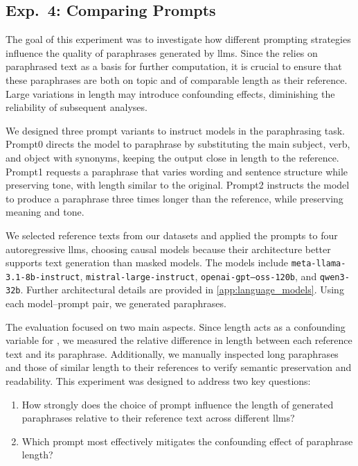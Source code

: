 \subsection{Exp.\ 4: Comparing Prompts}%
\label{subsec:prompt_impact}

The goal of this experiment was to investigate how different prompting strategies influence the quality of paraphrases generated by \acp{llm}.  
Since the \impAppr{} relies on paraphrased text as a basis for further computation, it is crucial to ensure that these paraphrases are both on topic and of comparable length as their reference.  
Large variations in length may introduce confounding effects, diminishing the reliability of subsequent analyses.

We designed three prompt variants to instruct models in the paraphrasing task.
Prompt0 directs the model to paraphrase by substituting the main subject, verb, and object with synonyms, keeping the output close in length to the reference.  
Prompt1 requests a paraphrase that varies wording and sentence structure while preserving tone, with length similar to the original.  
Prompt2 instructs the model to produce a paraphrase three times longer than the reference, while preserving meaning and tone. 

We selected reference texts from our datasets and applied the prompts to four autoregressive \acp{llm}, choosing causal models because their architecture better supports text generation than masked models. 
The models include \texttt{meta-llama-3.1-8b-instruct}, \texttt{mistral-large-instruct}, \texttt{openai-gpt--oss-120b}, and \texttt{qwen3-32b}.
Further architectural details are provided in \autoref{app:language_models}. 
Using each model–prompt pair, we generated paraphrases.

The evaluation focused on two main aspects. 
Since length acts as a confounding variable for \imps{}, we measured the relative difference in length between each reference text and its paraphrase. 
Additionally, we manually inspected long paraphrases and those of similar length to their references to verify semantic preservation and readability.
This experiment was designed to address two key questions:
\begin{enumerate}
\item How strongly does the choice of prompt influence the length of generated paraphrases relative to their reference text across different \acp{llm}?
\item Which prompt most effectively mitigates the confounding effect of paraphrase length?
\end{enumerate}
